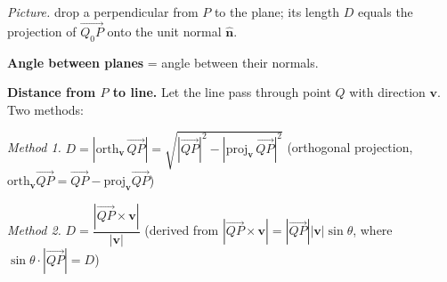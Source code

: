 \documentclass[12pt]{article}
\theoremstyle{compact}
\renewcommand{\vec}[1]{\mathbf{#1}}
\begin{document}
\textit{Picture.} drop a perpendicular from $P$ to the plane; its length $D$ equals the projection of $\overrightarrow{Q_0P}$ onto the unit normal $\hat{\vec n}$.

\textbf{Angle between planes} = angle between their normals.

\textbf{Distance from $P$ to line.} Let the line pass through point $Q$ with direction $\vec{v}$. Two methods:

\textit{Method 1.} $D = |\mathrm{orth}_{\vec{v}}\,\overrightarrow{QP}| = \sqrt{|\overrightarrow{QP}|^2 - |\mathrm{proj}_{\vec{v}}\,\overrightarrow{QP}|^2}$ \quad (orthogonal projection, $\mathrm{orth}_{\vec v}\overrightarrow{QP}=\overrightarrow{QP}-\mathrm{proj}_{\vec v}\overrightarrow{QP}$)

\textit{Method 2.} $D = \dfrac{|\overrightarrow{QP}\times\vec{v}|}{|\vec{v}|}$ \quad (derived from $|\overrightarrow{QP}\times\vec{v}| = |\overrightarrow{QP}||\vec{v}|\sin\theta$, where $\sin\theta \cdot |\overrightarrow{QP}| = D$)
\end{document}
